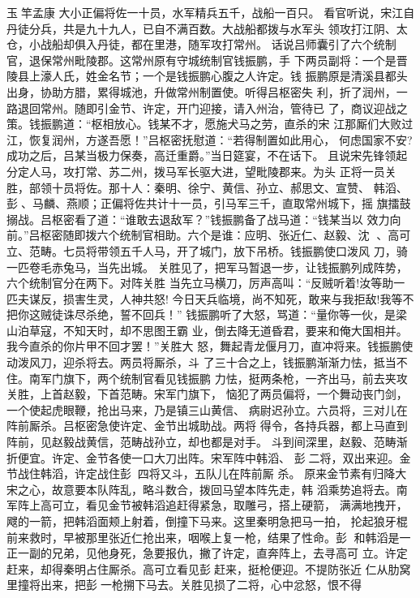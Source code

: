 玉竿孟康
大小正偏将佐一十员，水军精兵五千，战船一百只。
看官听说，宋江自丹徒分兵，共是九十九人，已自不满百数。大战船都拨与水军头
领攻打江阴、太仓，小战船却俱入丹徒，都在里港，随军攻打常州。
话说吕师囊引了六个统制官，退保常州毗陵郡。这常州原有守城统制官钱振鹏，手
下两员副将：一个是晋陵县上濠人氏，姓金名节；一个是钱振鹏心腹之人许定。钱
振鹏原是清溪县都头出身，协助方腊，累得城池，升做常州制置使。听得吕枢密失
利，折了润州，一路退回常州。随即引金节、许定，开门迎接，请入州治，管待已
了，商议迎战之策。钱振鹏道：“枢相放心。钱某不才，愿施犬马之劳，直杀的宋
江那厮们大败过江，恢复润州，方遂吾愿！”吕枢密抚慰道：“若得制置如此用心，
何虑国家不安?成功之后，吕某当极力保奏，高迁重爵。”当日筵宴，不在话下。
且说宋先锋领起分定人马，攻打常、苏二州，拨马军长驱大进，望毗陵郡来。为头
正将一员关胜，部领十员将佐。那十人：秦明、徐宁、黄信、孙立、郝思文、宣赞、
韩滔、彭、马麟、燕顺；正偏将佐共计十一员，引马军三千，直取常州城下，摇
旗擂鼓搦战。吕枢密看了道：“谁敢去退敌军？”钱振鹏备了战马道：“钱某当以
效力向前。”吕枢密随即拨六个统制官相助。六个是谁：应明、张近仁、赵毅、沈
、高可立、范畴。七员将带领五千人马，开了城门，放下吊桥。钱振鹏使口泼风
刀，骑一匹卷毛赤兔马，当先出城。
关胜见了，把军马暂退一步，让钱振鹏列成阵势，六个统制官分在两下。对阵关胜
当先立马横刀，厉声高叫：“反贼听着!汝等助一匹夫谋反，损害生灵，人神共怒!
今日天兵临境，尚不知死，敢来与我拒敌!我等不把你这贼徒诛尽杀绝，誓不回兵！”
钱振鹏听了大怒，骂道：“量你等一伙，是梁山泊草寇，不知天时，却不思图王霸
业，倒去降无道昏君，要来和俺大国相并。我今直杀的你片甲不回才罢！”关胜大
怒，舞起青龙偃月刀，直冲将来。钱振鹏使动泼风刀，迎杀将去。两员将厮杀，斗
了三十合之上，钱振鹏渐渐力怯，抵当不住。南军门旗下，两个统制官看见钱振鹏
力怯，挺两条枪，一齐出马，前去夹攻关胜，上首赵毅，下首范畴。宋军门旗下，
恼犯了两员偏将，一个舞动丧门剑，一个使起虎眼鞭，抢出马来，乃是镇三山黄信、
病尉迟孙立。六员将，三对儿在阵前厮杀。吕枢密急使许定、金节出城助战。两将
得令，各持兵器，都上马直到阵前，见赵毅战黄信，范畴战孙立，却也都是对手。
斗到间深里，赵毅、范畴渐折便宜。许定、金节各使一口大刀出阵。宋军阵中韩滔、
彭二将，双出来迎。金节战住韩滔，许定战住彭，四将又斗，五队儿在阵前厮
杀。
原来金节素有归降大宋之心，故意要本队阵乱，略斗数合，拨回马望本阵先走，韩
滔乘势追将去。南军阵上高可立，看见金节被韩滔追赶得紧急，取雕弓，搭上硬箭，
满满地拽开，飕的一箭，把韩滔面颊上射着，倒撞下马来。这里秦明急把马一拍，
抡起狼牙棍前来救时，早被那里张近仁抢出来，咽喉上复一枪，结果了性命。彭
和韩滔是一正一副的兄弟，见他身死，急要报仇，撇了许定，直奔阵上，去寻高可
立。许定赶来，却得秦明占住厮杀。高可立看见彭赶来，挺枪便迎。不提防张近
仁从肋窝里撞将出来，把彭一枪搠下马去。关胜见损了二将，心中忿怒，恨不得
